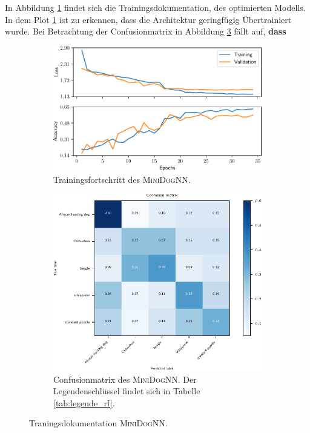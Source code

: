 In Abbildung \ref{fig:MiniDogNN_Loss_Acc} findet sich die Trainingsdokumentation,
des optimierten Modells. In dem Plot \ref{fig:MiniDogNN_Loss_Acc} ist zu erkennen,
dass die Architektur geringfügig Übertrainiert wurde.
Bei Betrachtung der Confusionmatrix in Abbildung \ref{fig:MiniDogNN_Confusionmatrix} fällt auf, \textbf{dass}
\begin{figure}
\centering
\begin{subfigure}{0.48\textwidth}
\centering
\includegraphics[width = \textwidth]{../../final_data/MiniNN_n5/history.pdf}
\caption{Trainingsfortschritt des \textsc{MiniDogNN}.}
\label{fig:MiniDogNN_Loss_Acc}
\end{subfigure}
\begin{subfigure}{0.48\textwidth}
\centering
\includegraphics[width = \textwidth]{../../final_data/MiniNN_n5/confusion_matrix.pdf}
\caption{Confusionmatrix des \textsc{MiniDogNN}. Der Legendenschlüssel findet sich in
Tabelle \ref{tab:legende_rf}.}
\label{fig:MiniDogNN_Confusionmatrix}
\end{subfigure}
\caption{Traningsdokumentation \textsc{MiniDogNN}.}
\end{figure}

